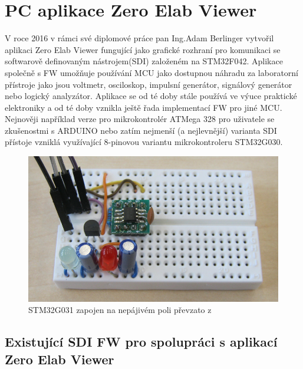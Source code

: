 \section{PC aplikace Zero Elab Viewer}
V roce 2016 v rámci své diplomové práce \cite{BerlingerDIP} pan Ing.Adam Berlinger vytvořil aplikaci Zero Elab Viewer fungující jako grafické rozhraní pro komunikaci se softwarově definovaným nástrojem(SDI) založeném na STM32F042. Aplikace společně s FW umožňuje používání MCU jako dostupnou náhradu za laboratorní přístroje  jako jsou voltmetr, osciloskop, impulsní generátor, signálový generátor nebo logický analyzátor. Aplikace se od té doby stále používá ve výuce praktické elektroniky a od té doby vznikla ještě řada implementací FW pro jiné MCU. Nejnověji například verze pro mikrokontrolér ATMega 328 pro uživatele se zkušenostmi s ARDUINO nebo zatím nejmenší (a nejlevnější) varianta SDI přístoje vzniklá využívající 8-pinovou variantu mikrokontroleru STM32G030.\\

\begin{figure}[H]
	\centering
	\includegraphics[width=0.5\linewidth]{Figs/Screenshots/G0_Lab_foto2}
	\caption{STM32G031 zapojen na nepájivém poli převzato z \cite{G030Foto}}
	\label{fig:g0labfoto2}
\end{figure}

\subsection{Existující SDI FW pro spolupráci s aplikací Zero Elab Viewer}


